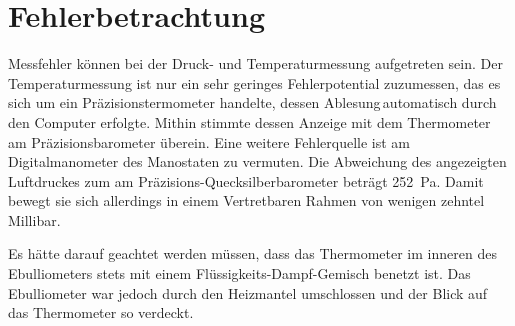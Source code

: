 \section{Fehlerbetrachtung}
\label{sec:fehler}

Messfehler können bei der Druck- und Temperaturmessung aufgetreten sein. Der Temperaturmessung ist nur ein sehr geringes Fehlerpotential zuzumessen, das es sich um ein Präzisionstermometer handelte, dessen \glqq Ablesung\grqq \,automatisch durch den Computer erfolgte. Mithin stimmte dessen Anzeige mit dem Thermometer am Präzisionsbarometer überein.
Eine weitere Fehlerquelle ist am Digitalmanometer des Manostaten zu vermuten. Die Abweichung des angezeigten Luftdruckes zum am Präzisions-Quecksilberbarometer beträgt \SI{252}{\pascal}. Damit bewegt sie sich allerdings in einem Vertretbaren Rahmen von wenigen zehntel Millibar.



Es hätte darauf geachtet werden müssen, dass das Thermometer im inneren des Ebulliometers stets mit einem Flüssigkeits-Dampf-Gemisch benetzt ist. Das Ebulliometer war jedoch durch den Heizmantel umschlossen und der Blick auf das Thermometer so verdeckt. 



